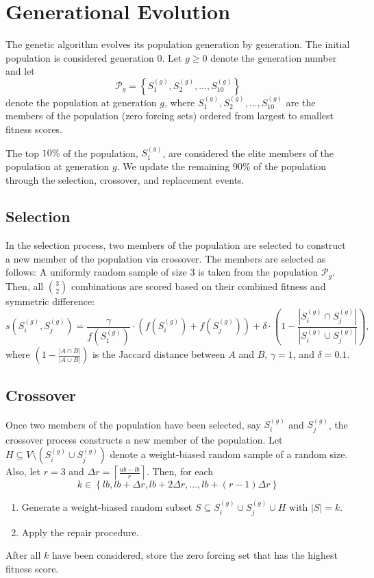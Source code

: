 \documentclass[11pt]{article}
\newcommand\abs[1]{\left|#1\right|}
\newcommand\ceil[1]{\left\lceil #1\right\rceil}
\begin{document}
\section{Generational Evolution}
The genetic algorithm evolves its population generation by generation. 
The initial population is considered generation $0$.
Let $g\geq 0$ denote the generation number and let 
\[
\mathcal{P}_{g} = \left\{S_{1}^{(g)},S_{2}^{(g)},\ldots,S_{10}^{(g)}\right\}
\]
denote the population at generation $g$, where $S_{1}^{(g)},S_{2}^{(g)},\ldots,S_{10}^{(g)}$ are the members of the population (zero forcing sets) ordered from largest to smallest fitness scores. 

The top $10\%$ of the population, $S_{1}^{(g)}$, are considered the elite members of the population at generation $g$. 
We update the remaining $90\%$ of the population through the selection, crossover, and replacement events. 

\subsection{Selection}
In the selection process, two members of the population are selected to construct a new member of the population via crossover.
The members are selected as follows: A uniformly random sample of size $3$ is taken from the population $\mathcal{P}_{g}$.
Then, all $\binom{3}{2}$ combinations are scored based on their combined fitness and symmetric difference:
\[
s\left(S_{i}^{(g)},S_{j}^{(g)}\right) = \frac{\gamma}{f(S_{1}^{(g)})}\cdot\left(f(S_{i}^{(g)})+f(S_{j}^{(g)})\right) + \delta\cdot\left(1 - \frac{\abs{S_{i}^{(g)}\cap S_{j}^{(g)}}}{\abs{S_{i}^{(g)}\cup S_{j}^{(g)}}}\right),
\]
where $\left(1-\frac{\abs{A\cap B}}{\abs{A\cup B}}\right)$ is the Jaccard distance between $A$ and $B$, $\gamma=1$, and $\delta=0.1$.

\subsection{Crossover}
Once two members of the population have been selected, say $S_{i}^{(g)}$ and $S_{j}^{(g)}$, the crossover process constructs a new member of the population.
Let $H\subseteq V\setminus\left(S_{i}^{(g)}\cup S_{j}^{(g)}\right)$ denote a weight-biased random sample of a random size.
Also, let $r=3$ and $\Delta r=\ceil{\frac{ub-lb}{r}}$.
Then, for each 
\[
k\in\left\{lb,lb+\Delta r,lb+2\Delta r,\ldots,lb+(r-1)\Delta r\right\}
\]
\begin{enumerate}
\item Generate a weight-biased random subset $S\subseteq S_{i}^{(g)}\cup S_{j}^{(g)}\cup H$ with $\abs{S}=k$.

\item Apply the repair procedure.
\end{enumerate}
After all $k$ have been considered, store the zero forcing set that has the highest fitness score. 
\end{document}

